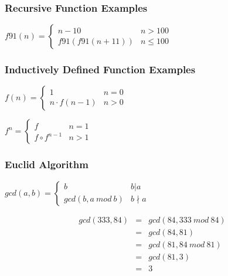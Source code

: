 \documentclass[dvipsnames]{beamer}
\begin{document}
\begin{frame}
  \frametitle{Recursive Function Examples}

  \begin{example}
    $f91(n) = \left\{
      \begin{array}{ll}
        n - 10         & n > 100\\
        f91(f91(n+11)) & n \leq 100
      \end{array}
    \right.$
  \end{example}
\end{frame}

\begin{frame}
  \frametitle{Inductively Defined Function Examples}

  \begin{example}[factorial]
    $f(n) = \left\{
      \begin{array}{ll}
        1              & n = 0\\
        n \cdot f(n-1) & n > 0
      \end{array}
    \right.$
  \end{example}

  \pause
  \begin{example}
    $f^n = \left\{
      \begin{array}{ll}
        f               & n = 1\\
        f \circ f^{n-1} & n > 1
      \end{array}
    \right.$
  \end{example}
\end{frame}

\begin{frame}
  \frametitle{Euclid Algorithm}

  \begin{example}
    $gcd(a,b) = \left\{
      \begin{array}{ll}
        b              & b | a\\
        gcd(b,a~mod~b) & b \nmid a
      \end{array}
    \right.$

    \pause
    \medskip
    \begin{eqnarray*}
      gcd(333,84) & = & gcd(84, 333~mod~84)\\
                  & = & gcd(84, 81)\\
                  & = & gcd(81, 84~mod~81)\\
                  & = & gcd(81, 3)\\
                  & = & 3
    \end{eqnarray*}
  \end{example}
\end{frame}
\end{document}
